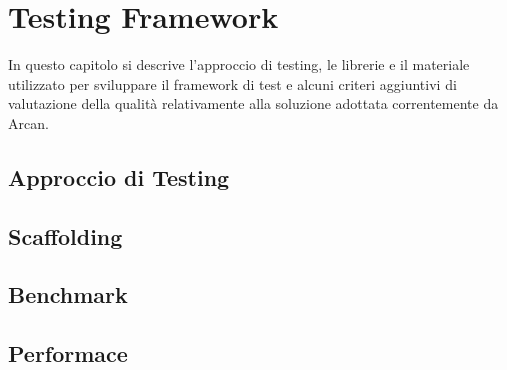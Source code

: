\chapter{Testing Framework}

In questo capitolo si descrive l'approccio di testing, le librerie e il materiale utilizzato per sviluppare il framework di test e alcuni criteri aggiuntivi di valutazione della qualit\`a relativamente alla soluzione adottata correntemente da Arcan.

\section{Approccio di Testing}

\section{Scaffolding}

\section{Benchmark}

\section{Performace}
